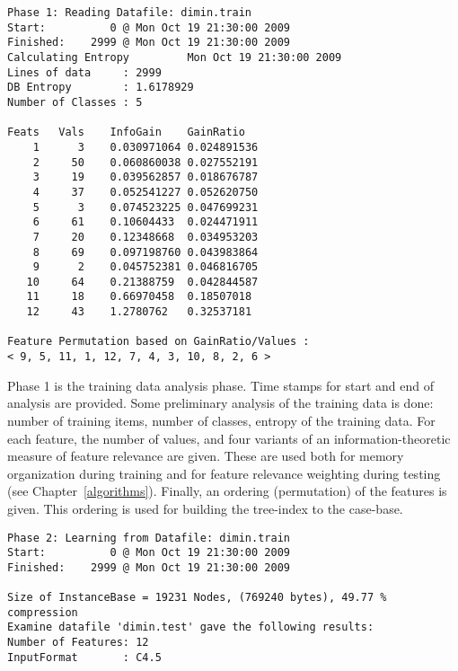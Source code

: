 \documentclass{book}
\begin{document}
{\footnotesize
\begin{verbatim}
Phase 1: Reading Datafile: dimin.train
Start:          0 @ Mon Oct 19 21:30:00 2009
Finished:    2999 @ Mon Oct 19 21:30:00 2009
Calculating Entropy         Mon Oct 19 21:30:00 2009
Lines of data     : 2999
DB Entropy        : 1.6178929
Number of Classes : 5

Feats	Vals	InfoGain	GainRatio
    1      3	0.030971064	0.024891536
    2     50	0.060860038	0.027552191
    3     19	0.039562857	0.018676787
    4     37	0.052541227	0.052620750
    5      3	0.074523225	0.047699231
    6     61	0.10604433	0.024471911
    7     20	0.12348668	0.034953203
    8     69	0.097198760	0.043983864
    9      2	0.045752381	0.046816705
   10     64	0.21388759	0.042844587
   11     18	0.66970458	0.18507018
   12     43	1.2780762	0.32537181

Feature Permutation based on GainRatio/Values :
< 9, 5, 11, 1, 12, 7, 4, 3, 10, 8, 2, 6 >
\end{verbatim}
}



Phase 1 is the training data analysis phase. Time stamps for start and
end of analysis are provided. Some preliminary analysis of the
training data is done: number of training items, number of classes,
entropy of the training data. For each feature, the number of values,
and four variants of an information-theoretic measure of feature
relevance are given. These are used both for memory organization
during training and for feature relevance weighting during testing
(see Chapter~\ref{algorithms}). Finally, an ordering (permutation) of
the features is given. This ordering is used for building the
tree-index to the case-base.




{\footnotesize
\begin{verbatim}
Phase 2: Learning from Datafile: dimin.train
Start:          0 @ Mon Oct 19 21:30:00 2009
Finished:    2999 @ Mon Oct 19 21:30:00 2009

Size of InstanceBase = 19231 Nodes, (769240 bytes), 49.77 % compression
Examine datafile 'dimin.test' gave the following results:
Number of Features: 12
InputFormat       : C4.5
\end{verbatim}
}

\end{document}
